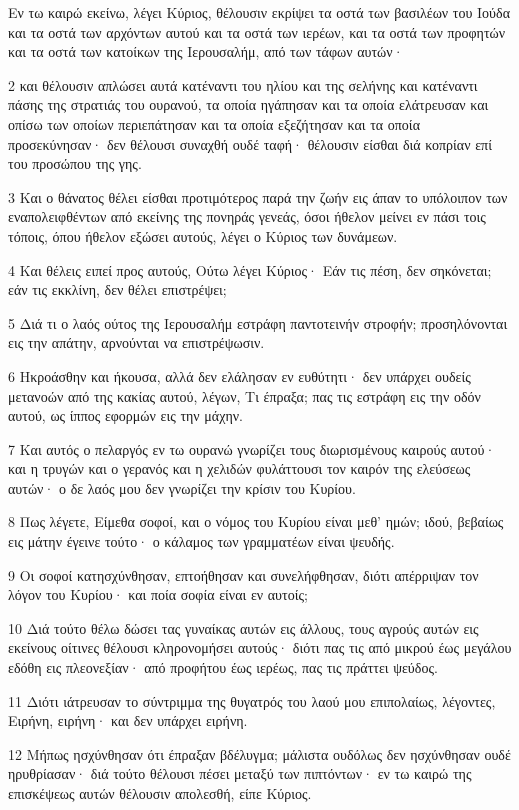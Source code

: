 \par Εν τω καιρώ εκείνω, λέγει Κύριος, θέλουσιν εκρίψει τα οστά των βασιλέων του Ιούδα και τα οστά των αρχόντων αυτού και τα οστά των ιερέων, και τα οστά των προφητών και τα οστά των κατοίκων της Ιερουσαλήμ, από των τάφων αυτών·
\par 2 και θέλουσιν απλώσει αυτά κατέναντι του ηλίου και της σελήνης και κατέναντι πάσης της στρατιάς του ουρανού, τα οποία ηγάπησαν και τα οποία ελάτρευσαν και οπίσω των οποίων περιεπάτησαν και τα οποία εξεζήτησαν και τα οποία προσεκύνησαν· δεν θέλουσι συναχθή ουδέ ταφή· θέλουσιν είσθαι διά κοπρίαν επί του προσώπου της γης.
\par 3 Και ο θάνατος θέλει είσθαι προτιμότερος παρά την ζωήν εις άπαν το υπόλοιπον των εναπολειφθέντων από εκείνης της πονηράς γενεάς, όσοι ήθελον μείνει εν πάσι τοις τόποις, όπου ήθελον εξώσει αυτούς, λέγει ο Κύριος των δυνάμεων.
\par 4 Και θέλεις ειπεί προς αυτούς, Ούτω λέγει Κύριος· Εάν τις πέση, δεν σηκόνεται; εάν τις εκκλίνη, δεν θέλει επιστρέψει;
\par 5 Διά τι ο λαός ούτος της Ιερουσαλήμ εστράφη παντοτεινήν στροφήν; προσηλόνονται εις την απάτην, αρνούνται να επιστρέψωσιν.
\par 6 Ηκροάσθην και ήκουσα, αλλά δεν ελάλησαν εν ευθύτητι· δεν υπάρχει ουδείς μετανοών από της κακίας αυτού, λέγων, Τι έπραξα; πας τις εστράφη εις την οδόν αυτού, ως ίππος εφορμών εις την μάχην.
\par 7 Και αυτός ο πελαργός εν τω ουρανώ γνωρίζει τους διωρισμένους καιρούς αυτού· και η τρυγών και ο γερανός και η χελιδών φυλάττουσι τον καιρόν της ελεύσεως αυτών· ο δε λαός μου δεν γνωρίζει την κρίσιν του Κυρίου.
\par 8 Πως λέγετε, Είμεθα σοφοί, και ο νόμος του Κυρίου είναι μεθ' ημών; ιδού, βεβαίως εις μάτην έγεινε τούτο· ο κάλαμος των γραμματέων είναι ψευδής.
\par 9 Οι σοφοί κατησχύνθησαν, επτοήθησαν και συνελήφθησαν, διότι απέρριψαν τον λόγον του Κυρίου· και ποία σοφία είναι εν αυτοίς;
\par 10 Διά τούτο θέλω δώσει τας γυναίκας αυτών εις άλλους, τους αγρούς αυτών εις εκείνους οίτινες θέλουσι κληρονομήσει αυτούς· διότι πας τις από μικρού έως μεγάλου εδόθη εις πλεονεξίαν· από προφήτου έως ιερέως, πας τις πράττει ψεύδος.
\par 11 Διότι ιάτρευσαν το σύντριμμα της θυγατρός του λαού μου επιπολαίως, λέγοντες, Ειρήνη, ειρήνη· και δεν υπάρχει ειρήνη.
\par 12 Μήπως ησχύνθησαν ότι έπραξαν βδέλυγμα; μάλιστα ουδόλως δεν ησχύνθησαν ουδέ ηρυθρίασαν· διά τούτο θέλουσι πέσει μεταξύ των πιπτόντων· εν τω καιρώ της επισκέψεως αυτών θέλουσιν απολεσθή, είπε Κύριος.
